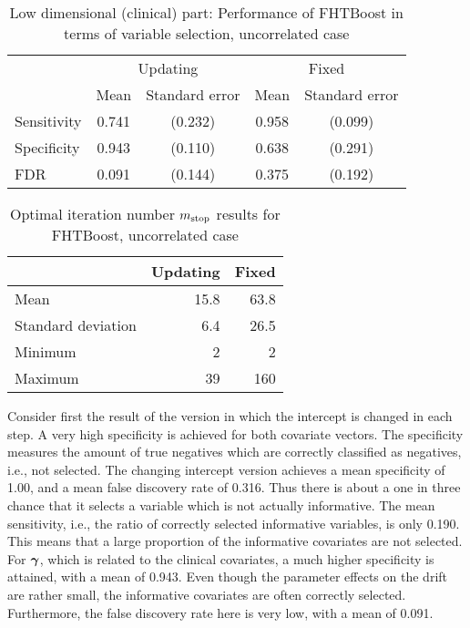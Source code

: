 \begin{table}
\caption{Low dimensional (clinical) part: Performance of FHTBoost in terms of variable selection, uncorrelated case}
\label{table:uncorrelated-mu}
\centering
\begin{tabular}{l|cc|cc}
\toprule
& \multicolumn{2}{c}{Updating} & \multicolumn{2}{c}{Fixed} \\
& Mean & Standard error & Mean & Standard error \\
\hline
Sensitivity & 0.741 & (0.232) & 0.958 & (0.099) \\
Specificity & 0.943 & (0.110) & 0.638 & (0.291) \\
FDR         & 0.091 & (0.144) & 0.375 & (0.192) \\
\bottomrule
\end{tabular}
\end{table}

\begin{table}
\caption{Optimal iteration number $m_{\text{stop}}$ results for FHTBoost, uncorrelated case}
\label{table:uncorrelated-mstop}
\centering
\begin{tabular}{l|rr}
\toprule
& Updating & Fixed \\
\hline
Mean               &  15.8  &  63.8  \\
Standard deviation &   6.4  &  26.5  \\
Minimum            &     2  &     2  \\
Maximum            &    39  &   160  \\
\bottomrule
\end{tabular}
\end{table}
Consider first the result of the version in which the intercept is changed in each step.
A very high specificity is achieved for both covariate vectors.
The specificity measures the amount of true negatives which are correctly classified as negatives, i.e., not selected.
The changing intercept version achieves a mean specificity of 1.00, and a mean false discovery rate of 0.316.
Thus there is about a one in three chance that it selects a variable which is not actually informative.
The mean sensitivity, i.e., the ratio of correctly selected informative variables, is only 0.190.
This means that a large proportion of the informative covariates are not selected.
For $\boldsymbol{\gamma}$, which is related to the clinical covariates, a much higher specificity is attained, with a mean of 0.943.
Even though the parameter effects on the drift are rather small, the informative covariates are often correctly selected.
Furthermore, the false discovery rate here is very low, with a mean of 0.091.

